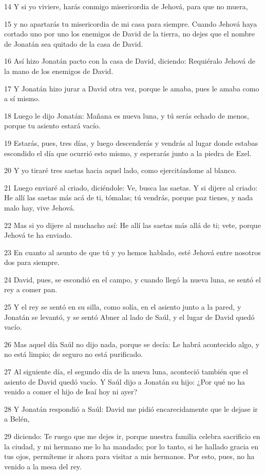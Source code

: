 \par 14 Y si yo viviere, harás conmigo misericordia de Jehová, para que no muera,
\par 15 y no apartarás tu misericordia de mi casa para siempre. Cuando Jehová haya cortado uno por uno los enemigos de David de la tierra, no dejes que el nombre de Jonatán sea quitado de la casa de David.
\par 16 Así hizo Jonatán pacto con la casa de David, diciendo: Requiéralo Jehová de la mano de los enemigos de David.
\par 17 Y Jonatán hizo jurar a David otra vez, porque le amaba, pues le amaba como a sí mismo.
\par 18 Luego le dijo Jonatán: Mañana es nueva luna, y tú serás echado de menos, porque tu asiento estará vacío.
\par 19 Estarás, pues, tres días, y luego descenderás y vendrás al lugar donde estabas escondido el día que ocurrió esto mismo, y esperarás junto a la piedra de Ezel.
\par 20 Y yo tiraré tres saetas hacia aquel lado, como ejercitándome al blanco.
\par 21 Luego enviaré al criado, diciéndole: Ve, busca las saetas. Y si dijere al criado: He allí las saetas más acá de ti, tómalas; tú vendrás, porque paz tienes, y nada malo hay, vive Jehová.
\par 22 Mas si yo dijere al muchacho así: He allí las saetas más allá de ti; vete, porque Jehová te ha enviado.
\par 23 En cuanto al asunto de que tú y yo hemos hablado, esté Jehová entre nosotros dos para siempre.
\par 24 David, pues, se escondió en el campo, y cuando llegó la nueva luna, se sentó el rey a comer pan.
\par 25 Y el rey se sentó en su silla, como solía, en el asiento junto a la pared, y Jonatán se levantó, y se sentó Abner al lado de Saúl, y el lugar de David quedó vacío.
\par 26 Mas aquel día Saúl no dijo nada, porque se decía: Le habrá acontecido algo, y no está limpio; de seguro no está purificado.
\par 27 Al siguiente día, el segundo día de la nueva luna, aconteció también que el asiento de David quedó vacío. Y Saúl dijo a Jonatán su hijo: ¿Por qué no ha venido a comer el hijo de Isaí hoy ni ayer?
\par 28 Y Jonatán respondió a Saúl: David me pidió encarecidamente que le dejase ir a Belén,
\par 29 diciendo: Te ruego que me dejes ir, porque nuestra familia celebra sacrificio en la ciudad, y mi hermano me lo ha mandado; por lo tanto, si he hallado gracia en tus ojos, permíteme ir ahora para visitar a mis hermanos. Por esto, pues, no ha venido a la mesa del rey.
